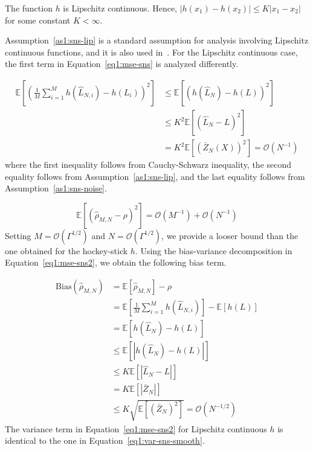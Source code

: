 \begin{assumption} \label{as1:sns-lip}
    The function $h$ is Lipschitz continuous. Hence, $|h(x_1) - h(x_2)| \leq K|x_1 - x_2|$ for some constant $K< \infty$.
\end{assumption}
Assumption~\ref{as1:sns-lip} is a standard assumption for analysis involving Lipschitz continuous functions, and it is also used in~\cite{broadie2015risk}.
For the Lipschitz continuous case, the first term in Equation~\ref{eq1:mse-sns} is analyzed differently.

\begin{align}
    \mathbb{E} \left[  \left( \frac{1}{M} \sum_{i=1}^M h\left( \hat{L}_{N, i} \right) -  h\left(L_i \right)  \right)^2\right]    
    & \leq \mathbb{E} \left[ \left( h\left( \hat{L}_N \right) -  h\left(L \right)  \right)^2\right]  \nonumber \\
    & \leq K^2 \mathbb{E} \left[ \left( \hat{L}_N -  L  \right)^2\right] \nonumber \\
    & = K^2 \mathbb{E} \left[ \left( \bar{Z}_{N}(X) \right)^2\right] = \mathcal{O}(N^{-1})
\end{align}
where the first inequality follows from Cauchy-Schwarz inequality, the second equality follows from Assumption~\ref{as1:sns-lip}, and the last equality follows from Assumption~\ref{as1:sns-noise}.

\begin{equation}
    \mathbb{E} \left[ \left( \hat{\rho}_{M, N} - \rho \right)^2 \right] = \mathcal{O}(M^{-1}) + \mathcal{O}(N^{-1})
\end{equation}
Setting $M = \mathcal{O}(\Gamma^{1/2})$ and $N = \mathcal{O}(\Gamma^{1/2})$, we provide a looser bound than the one obtained for the hockey-stick $h$.
Using the bias-variance decomposition in Equation~\ref{eq1:mse-sns2}, we obtain the following bias term.

\begin{align} \label{eq1:bias-sns-lip}
    \text{Bias}(\hat{\rho}_{M, N})
    & = \mathbb{E} \left[ \hat{\rho}_{M, N} \right] - \rho \nonumber \\
    & = \mathbb{E} \left[ \frac{1}{M} \sum_{i=1}^M h\left( \hat{L}_{N, i} \right) \right] - \mathbb{E} \left[ h\left(L \right) \right]  \nonumber \\
    & = \mathbb{E} \left[ h\left( \hat{L}_N \right) - h\left( L \right) \right] \nonumber \\
    & \leq \mathbb{E} \left[ |h\left( \hat{L}_N \right) - h\left( L \right) | \right] \nonumber \\
    & \leq K \mathbb{E} \left[ |\hat{L}_N - L| \right] \nonumber \\
    & = K \mathbb{E} \left[ |\bar{Z}_N| \right] \nonumber \\
    & \leq K \sqrt{\mathbb{E} \left[ \left( \bar{Z}_N \right)^2 \right]} = \mathcal{O}(N^{-1/2})
\end{align}
The variance term in Equation~\ref{eq1:mse-sns2} for Lipschitz continuous $h$ is identical to the one in Equation~\ref{eq1:var-sns-smooth}.

